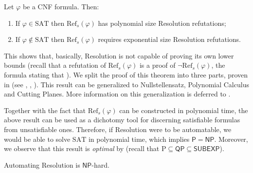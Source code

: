 \begin{theorem}[informal]
    \label{thm:ref_bounds}
    Let $\varphi$ be a CNF formula. Then:
    \begin{enumerate}[label={(\roman*)}, nosep]
        \item If $\varphi \in \mathrm{SAT}$ then $\mathrm{Ref}_s(\varphi)$ has polynomial size Resolution refutations;
        \item If $\varphi \notin \mathrm{SAT}$ then $\mathrm{Ref}_s(\varphi)$ requires exponential size Resolution refutations.
    \end{enumerate}
\end{theorem}

This shows that, basically, Resolution is not capable of proving its own lower bounds (recall that a refutation of $\mathrm{Ref}_s(\varphi)$ is a proof of $\lnot \mathrm{Ref}_s(\varphi)$, the formula stating that ). We split the proof of this theorem into three parts, proven in  (see , , ). This result can be generalized to Nullstellensatz, Polynomial Calculus and Cutting Planes. More information on this generalization is deferred to .

Together with the fact that $\mathrm{Ref}_s(\varphi)$ can be constructed in polynomial time, the above result can be used as a dichotomy tool for discerning satisfiable formulas from unsatisfiable ones. Therefore, if Resolution were to be automatable, we would be able to solve $\mathrm{SAT}$ in polynomial time, which implies $\mathsf{P} = \mathsf{NP}$. Moreover, we observe that this result is \textit{optimal} by  (recall that $\mathrm{P} \subseteq \mathsf{QP} \subseteq \mathsf{SUBEXP}$).

\begin{lemma}
    \label{lem:res_nphard}
    Automating Resolution is $\mathsf{NP}$-hard.
\end{lemma}

